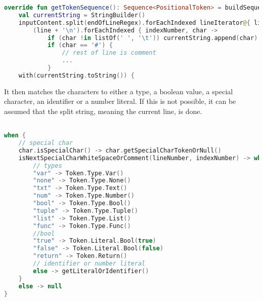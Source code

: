\begin{lstlisting}[language=Kotlin,label=lis:LexerStringSplit,caption=The string is being split and new lines are added to the string .,firstnumber=8]
override fun getTokenSequence(): Sequence<PositionalToken> = buildSequence {
	val currentString = StringBuilder()
	inputContent.split(endOfLineRegex).forEachIndexed lineIterator@{ lineNumber, line ->
		(line + '\n').forEachIndexed { indexNumber, char ->
			if (char !in listOf(' ', '\t')) currentString.append(char)
			if (char == '#') {
				// rest of line is comment
				...
			}
	with(currentString.toString()) {
\end{lstlisting}		
It then matches the characters to either a type, a boolean value, a special character, an identifier or a number literal.
If this is not possible, it can be assumed that the split string, meaning the current line, is done.
\begin{lstlisting}[language=Kotlin,label=lis:LexerStringMatcher,caption=The split string is being matched to a token,firstnumber=19]

when {
	// special char
	char.isSpecialChar() -> char.getSpecialCharTokenOrNull()
	isNextSpecialCharWhiteSpaceOrComment(lineNumber, indexNumber) -> when (this) {
		// types
		"var" -> Token.Type.Var()
		"none" -> Token.Type.None()
		"txt" -> Token.Type.Text()
		"num" -> Token.Type.Number()
		"bool" -> Token.Type.Bool()
		"tuple" -> Token.Type.Tuple()
		"list" -> Token.Type.List()
		"func" -> Token.Type.Func()
		//bool
		"true" -> Token.Literal.Bool(true)
		"false" -> Token.Literal.Bool(false)
		"return" -> Token.Return()
		// identifier or number literal
		else -> getLiteralOrIdentifier()
	}
	else -> null
}
\end{lstlisting}
